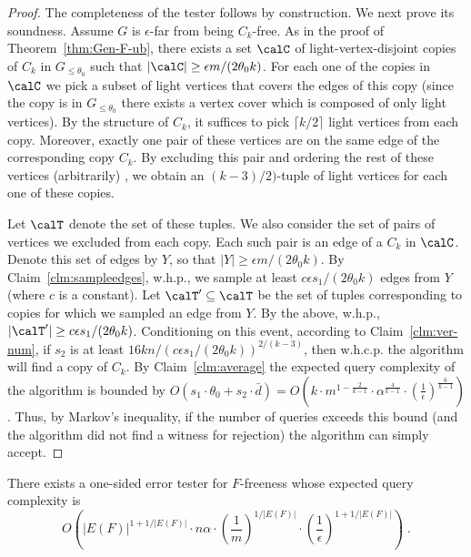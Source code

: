 \begin{proof}
The completeness of the tester follows by construction. %
We next prove its soundness. Assume $G$ is $\epsilon$-far from being $C_k$-free.
As in the proof of Theorem~\ref{thm:Gen-F-ub}, there exists a set $\calC$ of light-vertex-disjoint copies of $C_k$ in $G_{\leq \theta_0}$ such that $|\calC|\geq \epsilon m/ (2\theta_0 k)$.
For each one of the copies in $\calC$ we pick a subset of light vertices that covers the edges of this copy (since the copy is in $G_{\leq \theta_0}$ there exists a vertex cover which is composed of only light vertices).
By the structure of $C_k$, it suffices to pick $\lceil k/2 \rceil$ light vertices from each copy.
Moreover, exactly one pair of these vertices are on the same edge of the corresponding copy $C_k$.
By excluding this pair and ordering the rest of these vertices (arbitrarily) , we obtain an $(k-3)/2)$-tuple of light vertices for each one of these copies.

Let $\calT$ denote the set of these tuples.
We also consider the set of pairs of vertices we excluded from each copy.
Each such pair is an edge of a $C_k$ in $\calC$.
Denote this set of edges by $Y$, so that
$|Y| \geq \epsilon m/ (2\theta_0 k)$.
By Claim~\ref{clm:sampleedges}, w.h.p., we sample at least $c \epsilon s_1/ (2\theta_0 k) $ edges from $Y$ (where $c$ is a constant).
Let $\calT' \subseteq \calT$ be the set of tuples corresponding to copies for which we sampled an edge from $Y$.
By the above, w.h.p., $|\calT'| \geq c \epsilon s_1/ (2\theta_0 k) $.
Conditioning on this event, according to Claim~\ref{clm:ver-num}, if $s_2$ is at least $16 k n / (c \epsilon s_1/ (2\theta_0 k))^{2/(k-3)}$, then w.h.c.p. the algorithm will find a copy of $C_k$.
By Claim~\ref{clm:average} the expected query complexity of the algorithm is bounded by $O(s_1 \cdot \theta_0 + s_2 \cdot \bar{d}) = O\left(k \cdot m^{1- \frac{2}{k-1}} \cdot \alpha^{\frac{4}{k-1}} \cdot \left( \frac{1}{\epsilon}\right)^{\frac{6}{k-1}} \right)$. Thus, by Markov's inequality, if the number of queries exceeds this bound (and the algorithm did not find a witness for rejection) the algorithm can simply accept. 
\end{proof}

\iffalse
\begin{theorem}\label{thm:Gen-F-ub2}
There exists a one-sided error tester for $F$-freeness whose expected query complexity is $$O\left(|E(F)|^{1+1/|E(F)|} \cdot n\alpha \cdot \left(\frac{1}{m }\right)^{1/|E(F)|} \cdot \left(\frac{1}{\epsilon}\right)^{1+1/|E(F)|}\right)\;.$$
\end{theorem}

